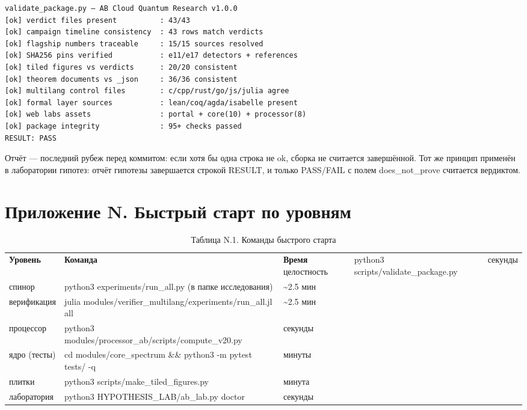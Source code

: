 \documentclass[11pt,a4paper]{article}
\begin{document}
\begin{verbatim}
validate_package.py — AB Cloud Quantum Research v1.0.0
[ok] verdict files present          : 43/43
[ok] campaign timeline consistency  : 43 rows match verdicts
[ok] flagship numbers traceable     : 15/15 sources resolved
[ok] SHA256 pins verified           : e11/e17 detectors + references
[ok] tiled figures vs verdicts      : 20/20 consistent
[ok] theorem documents vs _json     : 36/36 consistent
[ok] multilang control files        : c/cpp/rust/go/js/julia agree
[ok] formal layer sources           : lean/coq/agda/isabelle present
[ok] web labs assets                : portal + core(10) + processor(8)
[ok] package integrity              : 95+ checks passed
RESULT: PASS
\end{verbatim}

Отчёт — последний рубеж перед коммитом: если хотя бы одна строка не ok, сборка не считается завершённой. Тот же принцип применён в лаборатории гипотез: отчёт гипотезы завершается строкой RESULT, и только PASS/FAIL с полем does\_not\_prove считается вердиктом.

\section{Приложение N. Быстрый старт по уровням}

\begin{table}[htbp]\centering\small
\caption{Таблица N.1. Команды быстрого старта}
\begin{tabular}{p{} p{} p{}}
\toprule
\textbf{Уровень} & \textbf{Команда} & \textbf{Время}
\midrule
целостность & python3 scripts/validate\_package.py & секунды \\
спинор & python3 experiments/run\_all.py (в папке исследования) & \textasciitilde{}2.5 мин \\
верификация & julia modules/verifier\_multilang/experiments/run\_all.jl all & \textasciitilde{}2.5 мин \\
процессор & python3 modules/processor\_ab/scripts/compute\_v20.py & секунды \\
ядро (тесты) & cd modules/core\_spectrum \&\& python3 -m pytest tests/ -q & минуты \\
плитки & python3 scripts/make\_tiled\_figures.py & минута \\
лаборатория & python3 HYPOTHESIS\_LAB/ab\_lab.py doctor & секунды \\
\bottomrule
\end{tabular}
\end{table}
\end{document}
